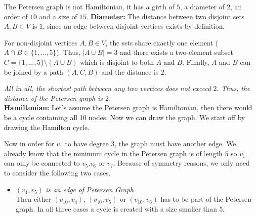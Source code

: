 \documentclass[a4paper]{article}
\begin{document}
\begin{solution}{9}
\begin{theorem}{The Petersen graph is not Hamiltonian, it has a girth of $5$, a diameter of $2$, an order of $10$ and a size of $15$.}
			\textbf{Diameter:} The distance between two disjoint sets $A, B \in V$ is $1$, since an edge between disjoint vertices exists by definition.
				
				For non-disjoint vertices $A, B \in V$, the sets share exactly one element ($A \cap B \in \{1, ..., 5\}$). Thus, $|A \cup B| = 3$ and there exists a two-element subset $C = \{1, ..., 5\} \setminus (A \cup B)$ which is disjoint to both $A$ and $B$. Finally, $A$ and $B$ can be joined by a path $(A, C, B)$ and the distance is $2$.

				\emph{All in all, the shortest path between any two vertices does not exceed $2$. Thus, the distance of the Petersen graph is $2$.}\\

			\textbf{Hamiltonian:}
			Let's assume the Petersen graph is Hamiltonian, then there would be a cycle containing all 10 nodes. 
			Now we can draw the graph. We start off by drawing the Hamilton cycle. 
			\begin{center}
			\end{center}
			Now in order for $v_1$ to have degree 3, the graph must have another edge. 
			We already know that the minimum cycle in the Petersen graph is of length $5$ so $v_1$ can only be connected to $v_5$,$v_6$ or $v_7$. 
			Because of symmetry reasons, we only need to consider the following two cases. 
			\begin{itemize}
				\item \emph{$(v_1,v_5)$ is an edge of Petersen Graph}\\
					Then either $(v_{10},v_4)$, $(v_{10},v_5)$ or $(v_{10},v_6)$ has to be part of the Petersen graph. 
					In all three cases a cycle is created with a size smaller than 5. 

\end{itemize}
\end{theorem}
\end{solution}
\end{document}
